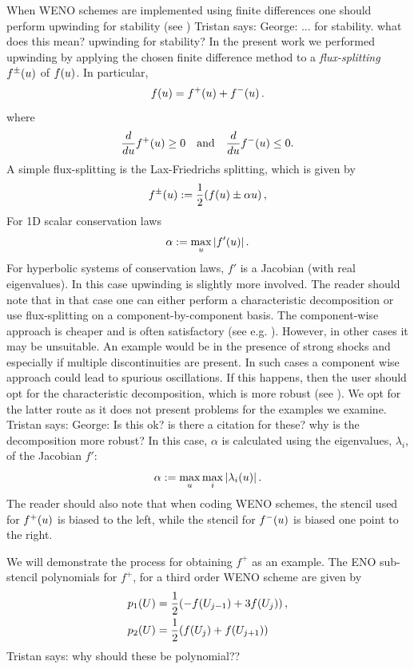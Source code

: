 \documentclass[final]{amsart}
\newcommand{\tristan}[1]{{\color{purple} Tristan says:  #1 }}
\numberwithin{equation}{section}
\begin{document}
\begin{Rem}
  When WENO schemes are implemented using finite differences one
  should perform upwinding for stability (see
  \cite{shu1998essentially}) \tristan{George: ... for stability. what does this mean? upwinding
    for stability?}  In the present work we performed upwinding by applying the chosen finite difference method
  to a \textit{flux-splitting} $f^{\pm}\!\left({u}\right)$ of $f\!\left({u}\right)$.  In
  particular,
  \begin{equation}
    f\!\left({u}\right)= f^+\!\left({u}\right) + f^-\!\left({u}\right).
  \end{equation}
  where 
  \begin{equation}
    \frac{d}{du}f^+\!\left({u}\right) \geq 0 \quad \text{and}\quad \frac{d}{du}f^-\!\left({u}\right) \leq 0.
  \end{equation}
  A simple flux-splitting is the Lax-Friedrichs splitting, which is given by 
  \begin{equation}
    f^{\pm}\!\left({u}\right):=\frac{1}{2}\!\left({f\!\left({u}\right)\pm \alpha u}\right),
  \end{equation}
  For 1D scalar conservation laws
  \begin{equation}
    \alpha:=\max_{u}\left|f'\!\left({u}\right)\right|.
  \end{equation}
  For hyperbolic systems of conservation laws, ${f}'$ is a Jacobian
  (with real eigenvalues).  In this case upwinding is slightly more
  involved. The reader should note that in that case one can either
  perform a characteristic decomposition or use flux-splitting on a component-by-component basis.  The component-wise approach is  cheaper and is often satisfactory (see e.g. \cite[Procedure 2.7]{shu1988efficient}).  However, in other cases it may be unsuitable.  An example would be in the presence of strong shocks and especially if multiple discontinuities are present.  In such cases a component wise approach could lead to spurious oscillations. If this happens, then the user should opt for  the characteristic decomposition, which is more robust (see \cite[\S 4.1]{shu2020essentially}). 
  We opt for the latter route as it does not present problems for the examples we examine. \tristan{George: Is this ok? is there a citation for these? why is the
    decomposition more robust?}  In this case, $\alpha$ is calculated
  using the eigenvalues, $\lambda_i$, of the Jacobian ${f}'$:
  \begin{equation}
    \alpha := \max_{u} \max_{i} \left|\lambda_i\!\left({u}\right)\right|.
  \end{equation}
  The reader should also note that when coding WENO schemes, the
  stencil used for $f^+\!\left({u}\right)$ is biased to the left, while the
  stencil for $f^-\!\left({u}\right)$ is biased one point to the right.
\end{Rem}
We will demonstrate the process for obtaining $f^+$ as an example. The
ENO sub-stencil polynomials for $f^+$, for a third order WENO scheme
are given by
\begin{equation}
\begin{aligned}
p_1\qp{U} &= \frac{1}{2}\qp{-f\qp{U_{j-1}} + 3f\qp{U_j}},\\
p_2\qp{U} &= \frac{1}{2}\qp{f\qp{U_{j}} + f\qp{U_{j+1}}}
\end{aligned}
\end{equation}
\tristan{why should these be polynomial??}
\end{document}
